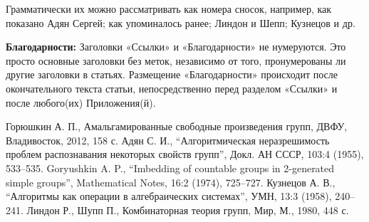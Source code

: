 \documentclass[12pt]{article}
\begin{document}
Грамматически их можно рассматривать как номера сносок, например, как показано Адян Сергей\cite{2}; как упоминалось ранее\cite{1, 2, 3, 4, 5}; Линдон и Шепп\cite{5}; Кузнецов и др\cite{4}.

\textbf{Благодарности:}
Заголовки «Ссылки» и «Благодарности» не нумеруются. Это просто основные заголовки без меток, независимо от того, пронумерованы ли другие заголовки в статьях.
Размещение «Благодарности» происходит после окончательного текста статьи, непосредственно перед разделом «Ссылки» и после любого(их) Приложения(й).

\begin{thebibliography}{00}\label{ref:ref}
Горюшкин А. П., Амальгамированные свободные произведения групп, ДВФУ, Владивосток, 2012, 158 с.
Адян С. И., “Алгоритмическая неразрешимость проблем распознавания некоторых свойств групп”, Докл. АН СССР, 103:4 (1955), 533–535.
Goryushkin A. P., “Imbedding of countable groups in 2-generated simple groups”, Mathematical Notes, 16:2 (1974), 725–727.
Кузнецов А. В., “Алгоритмы как операции в алгебраических системах”, УМН, 13:3 (1958), 240–241.
Линдон Р., Шупп П., Комбинаторная теория групп, Мир, М., 1980, 448 с.
\end{thebibliography}
\end{document}
